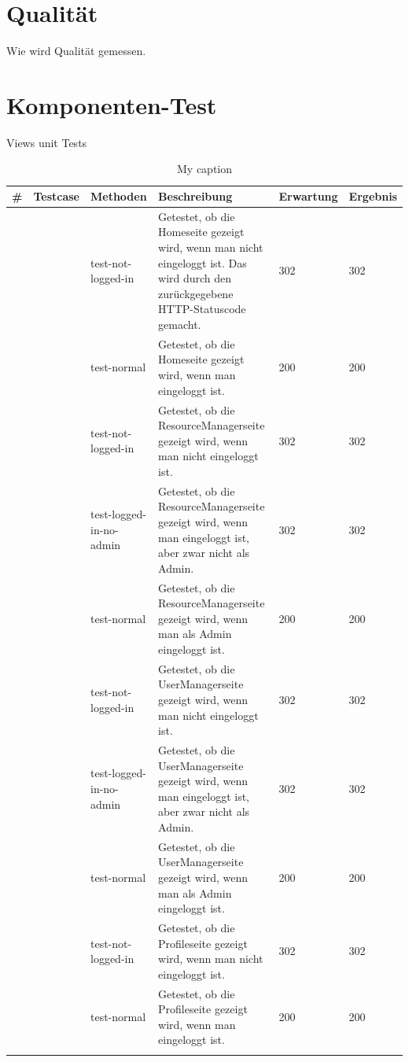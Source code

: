\documentclass[parskip=full,11pt]{scrartcl}
\begin{document}
 \section{Qualität}
 Wie wird Qualität gemessen.
 
 \newpage
\section{Komponenten-Test}
Views unit Tests

\begin{longtable}[c]{|p{0.4cm}|p{2.5cm}|p{3.5cm}|p{5cm}|p{2cm}|p{1.8cm}|}
\caption{My caption}
\label{my-label}\\
\hline
\textbf{\#} & \textbf{Testcase}&\textbf{Methoden}& \textbf{Beschreibung} & \textbf{Erwartung} & \textbf{Ergebnis} \\ \hline
\endfirsthead
%
\endhead
%
\multirow{2}{*}{}1 & \multirow{2}{*}{} TestHomeView & test-not-logged-in & Getestet, ob die Homeseite gezeigt wird, wenn man nicht eingeloggt ist. Das wird durch den zurückgegebene HTTP-Statuscode gemacht.& 302  & 302 \\ \cline{3-6} &   & test-normal & Getestet, ob die Homeseite gezeigt wird, wenn man eingeloggt ist.  & 200 & 200 \\ \hline
\multirow{3}{*}{} 2& \multirow{3}{*}{} TestResourceManager&  test-not-logged-in & Getestet, ob die ResourceManagerseite gezeigt wird, wenn man nicht eingeloggt ist. & 302  & 302  \\ \cline{3-6} & & test-logged-in-no-admin & Getestet, ob die ResourceManagerseite gezeigt wird, wenn man eingeloggt ist, aber zwar nicht als Admin. & 302 & 302 \\ \cline{3-6} & & test-normal & Getestet, ob die ResourceManagerseite gezeigt wird, wenn man als Admin  eingeloggt ist. & 200 & 200  \\ \hline
\multirow{3}{*}{} 3& \multirow{3}{*}{} TestUserManager&  test-not-logged-in & Getestet, ob die UserManagerseite gezeigt wird, wenn man nicht eingeloggt ist. & 302  & 302  \\ \cline{3-6} & & test-logged-in-no-admin & Getestet, ob die UserManagerseite gezeigt wird, wenn man eingeloggt ist, aber zwar nicht als Admin. & 302 & 302 \\ \cline{3-6} & & test-normal & Getestet, ob die UserManagerseite gezeigt wird, wenn man als Admin  eingeloggt ist. & 200 & 200  \\ \hline
\multirow{5}{*}{} 4& \multirow{5}{*}{} TestProfileView& test-not-logged-in & Getestet, ob die Profileseite gezeigt wird, wenn man nicht eingeloggt ist.& 302  & 302 \\ \cline{3-6} &   & test-normal & Getestet, ob die Profileseite gezeigt wird, wenn man eingeloggt ist.  & 200 & 200 \\ \cline{3-6} 

\end{longtable}
\end{document}
